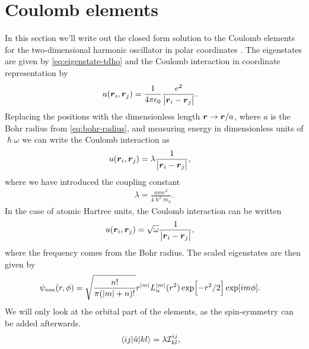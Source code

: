     \section{Coulomb elements}
        \label{app:coulomb-elements}
        In this section we'll write out the closed form solution to the Coulomb
        elements for the two-dimensional harmonic oscillator in polar
        coordinates \cite{anisimovas1998energy}.
        The eigenstates are given by \autoref{eq:eigenstate-tdho} and the
        Coulomb interaction in coordinate representation by
        \begin{align}
            u(\boldsymbol{r}_i, \boldsymbol{r}_j)
            &= \frac{1}{4\pi\epsilon_0}\frac{e^2}{\abs{\boldsymbol{r}_i - \boldsymbol{r}_j}}.
        \end{align}
        Replacing the positions with the dimensionless length $\boldsymbol{r} \to
        \boldsymbol{r}/a$, where $a$ is the Bohr radius from \autoref{eq:bohr-radius},
        and measuring energy in dimensionless units of $\hslash \omega$
        \cite{anisimovas1998energy} we can write the Coulomb interaction as
        \begin{align}
            u(\boldsymbol{r}_i, \boldsymbol{r}_j)
            &= \lambda
            \frac{1}{\abs{\boldsymbol{r}_i - \boldsymbol{r}_j}},
        \end{align}
        where we have introduced the coupling constant
        \begin{align}
            \lambda = \frac{a m e^2}{4 \hslash^2 \pi \epsilon_0}.
        \end{align}
        In the case of atomic Hartree units, the Coulomb
        interaction can be written
        \begin{align}
            u(\boldsymbol{r}_i, \boldsymbol{r}_j)
            &= \sqrt{\omega}
            \frac{1}{\abs{\boldsymbol{r}_i - \boldsymbol{r}_j}},
        \end{align}
        where the frequency comes from the Bohr radius.
        The scaled eigenstates are then given by
        \begin{align}
            \psi_{nm}(r, \phi)
            &= \sqrt{\frac{n!}{\pi(\abs{m} + n)!}}
            r^{\abs{m}} L^{\abs{m}}_n(r^2)
            \exp[-r^2/2]
            \exp[im\phi].
        \end{align}
        We will only look at the orbital part of the elements, as the
        spin-symmetry can be added afterwards.
        \begin{align}
            \mel{ij}{\hat{u}}{kl}
            &= \lambda
            \mathcal{I}^{ij}_{kl},
        \end{align}
